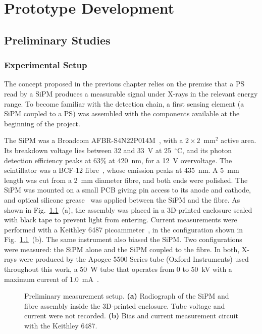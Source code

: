 \newpage
\chapter{Prototype Development}
\label{chapter:development}

\section{Preliminary Studies}
\label{sec:Preliminary Studies}
\subsection{Experimental Setup}
The concept proposed in the previous chapter relies on the premise that a PS read by a SiPM produces a measurable signal under X-rays in the relevant energy range. To become familiar with the detection chain, a first sensing element (a SiPM coupled to a PS) was assembled with the components available at the beginning of the project.

The SiPM was a Broadcom AFBR-S4N22P014M~\cite{broadcom2025afbrs4n22}, with a $2 \times 2$~mm$^2$ active area. Its breakdown voltage lies between 32 and 33~V at 25~$^{\circ}$C, and its photon detection efficiency peaks at 63\% at 420~nm, for a 12~V overvoltage. The scintillator was a BCF-12 fibre~\cite{luxiumfibers}, whose emission peaks at 435~nm. A 5~mm length was cut from a 2~mm diameter fibre, and both ends were polished. The SiPM was mounted on a small PCB giving pin access to its anode and cathode, and optical silicone grease~\cite{saintgobain2005bc630} was applied between the SiPM and the fibre. As shown in Fig.~\ref{fig:prelim_setup}~(a), the assembly was placed in a 3D-printed enclosure sealed with black tape to prevent light from entering. Current measurements were performed with a Keithley 6487 picoammeter~\cite{keithley2011model6487}, in the configuration shown in Fig.~\ref{fig:prelim_setup}~(b). The same instrument also biased the SiPM. Two configurations were measured: the SiPM alone and the SiPM coupled to the fibre. In both, X-rays were produced by the Apogee 5500 Series tube (Oxford Instruments) used throughout this work, a 50~W tube that operates from 0 to 50~kV with a maximum current of 1.0~mA~\cite{oxford2019apogee}.
\begin{figure}[H]
  \centering
  \resizebox{0.85\linewidth}{!}{}
  \caption[Preliminary measurement setup.]{%
    Preliminary measurement setup.
    \textbf{(a)} Radiograph of the SiPM and fibre assembly inside the 3D-printed enclosure. Tube voltage and current were not recorded.
    \textbf{(b)} Bias and current measurement circuit with the Keithley 6487.
  }
  \label{fig:prelim_setup}
\end{figure}

